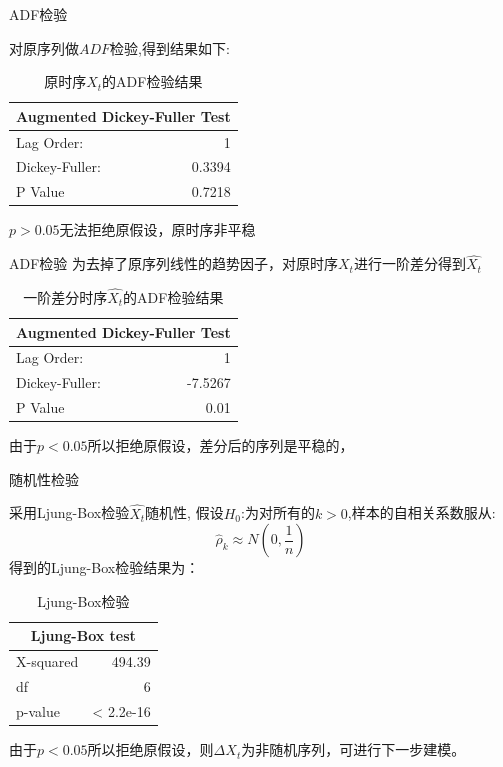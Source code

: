 \documentclass[10pt]{beamer}
\begin{document}
\begin{frame}{ADF检验}

  对原序列做\(ADF\)检验,得到结果如下:
  \begin{table}[htb]
    \centering
    \caption{原时序\(X_t\)的ADF检验结果}
      \begin{tabular}{l|r}
      \multicolumn{2}{c}{ Augmented Dickey-Fuller Test} \\
      \hline
      Lag Order: & 1 \\
      Dickey-Fuller: & 0.3394\\
      P Value  & 0.7218 \\
      \end{tabular}%
    \label{tab:ADF_raw}%
  \end{table}%
  \(p>0.05\)无法拒绝原假设，原时序非平稳
\end{frame}

\begin{frame}{ADF检验}
  为去掉了原序列线性的趋势因子，对原时序\(X_t\)进行一阶差分得到\(\hat{X_t}\)
  \begin{table}[H]
  \centering
  \caption{一阶差分时序\(\hat{X_t}\)的ADF检验结果}
    \begin{tabular}{l|r}
    \multicolumn{2}{c}{ Augmented Dickey-Fuller Test} \\
    \hline
    Lag Order: & 1 \\
    Dickey-Fuller: & -7.5267\\
    P Value  & 0.01 \\
    \end{tabular}%
  \label{tab:ADF_diff}%
\end{table}%
由于\(p<0.05\)所以拒绝原假设，差分后的序列是平稳的，
\end{frame}


\begin{frame}{随机性检验}

  采用Ljung-Box检验\(\hat{X_t}\)随机性,
  假设\(H_0\):为对所有的\(k>0\),样本的自相关系数服从:
  \[\hat{\rho}_k \approx N(0,\frac{1}{n})\]
  得到的Ljung-Box检验结果为：
  \begin{table}[H]
    \centering
    \caption{Ljung-Box检验}
      \begin{tabular}{l|r}
      \multicolumn{2}{c}{Ljung-Box test} \\
      \hline
      X-squared  & \multicolumn{1}{r}{494.39} \\
      df    & \multicolumn{1}{r}{6} \\
      p-value & < 2.2e-16 \\
      \end{tabular}%
    \label{tab:Ljung-Box}%
  \end{table}%

  由于\(p<0.05\)所以拒绝原假设，则\(\Delta X_t\)为非随机序列，可进行下一步建模。
\end{frame}
\end{document}
